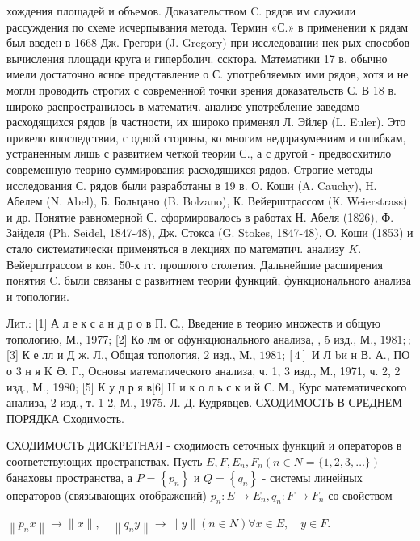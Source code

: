 \documentclass[10pt]{article}
\begin{document}
хождения площадей и объемов. Доказательством $\mathrm{C}$. рядов им служили рассуждения по схеме исчерпывания метода. Термин «С.» в применении к рядам был введен в 1668 Дж. Грегори (J. Gregory) при исследовании нек-рых способов вычисления площади круга и гиперболич. ссктора. Математики 17 в. обычно имели достаточно ясное представление о С. употребляемых ими рядов, хотя и не могли проводить строгих с современной точки зрения доказательств С. В 18 в. широко распространилось в математич. анализе употребление заведомо расходящихся рядов [в частности, их широко применял Л. Эйлер (L. Euler). Это привело впоследствии, с одной стороны, ко многим недоразумениям и ошибкам, устраненным лишь с развитием четкой теории С., а с другой - предвосхитило современную теорию суммирования расходящихся рядов. Строгие методы исследования С. рядов были разработаны в 19 в. О. Коши (A. Cauchy), Н. Абелем (N. Abel), Б. Больцано (B. Bolzano), К. Вейерштрассом (К. Weierstrass) и др. Понятие равномерной С. сформировалось в работах Н. Абеля (1826), Ф. Зайделя (Ph. Seidel, 1847-48), Дж. Стокса (G. Stokes, 1847-48), О. Коши (1853) и стало систематически применяться в лекциях по математич. анализу $K$. Вейерштрассом в кон. 50-х гг. прошлого столетия. Дальнейшие расширения понятия $\mathrm{C}$. были связаны с развитием теории функций, функционального анализа и топологии.



Лит.: [1] А л е к с а н д р о в П. С., Введение в теорию множеств и общую топологию, М., 1977; [2] Ко лм ог офункционального анализа, , 5 изд., М., $1981 ;$; [3] К е лл и Д ж. Л., Общая топология, 2 изд., М., $1981 ;[4]$ И Л bи н В. А., ПО о 3 н я $\mathrm{K}$ Ә. Г., Основы математического анализа, ч. 1, 3 изд., М., 1971, ч. 2, 2 изд., М., 1980; [5] К у д р я в[6] Н и к о л ь с к и й С. М., Курс математического анализа, 2 изд., т. 1-2, М., 1975. Л. Д. Кудрявцев. СХОДИМОСТЬ В СРЕДНЕМ ПОРЯДКА Сходимость.



СХОДИМОСТЬ ДИСКРЕТНАЯ - сходимость сеточных функций и операторов в соответствующих пространствах. Пусть $E, F, E_{n}, F_{n}(n \in N=\{1,2,3, \ldots\})$ банаховы пространства, а $P=\left\{p_{n}\right\}$ и $Q=\left\{q_{n}\right\}$ - системы линейных операторов (связывающих отображений) $p_{n}: E \rightarrow E_{n}, q_{n}: F \rightarrow F_{n}$ со свойством



$\left\|p_{n} x\right\| \rightarrow\|x\|, \quad\left\|q_{n} y\right\| \longrightarrow\|y\|(n \in N) \forall x \in E, \quad y \in F$.
\end{document}
